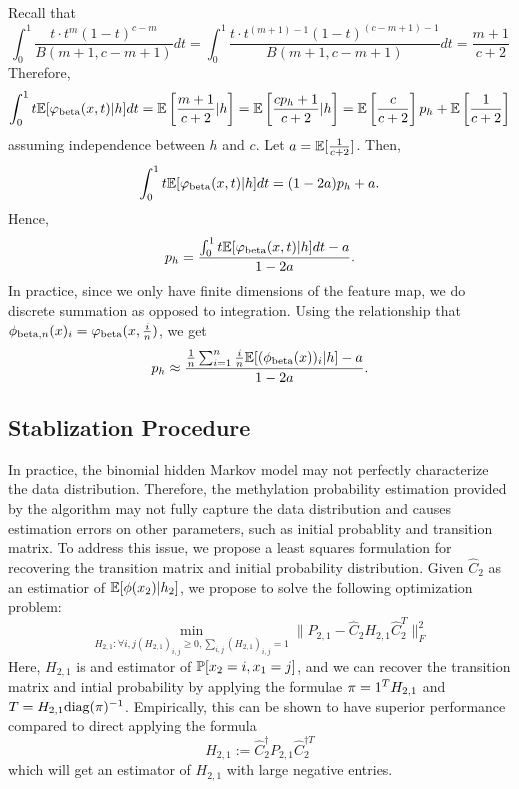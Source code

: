 Recall that
\[ \int_0^1 \frac{t \cdot t^{m} (1-t)^{c-m}}{B(m+1,c-m+1)} dt = \int_0^1 \frac{t \cdot t^{(m+1)-1} (1-t)^{(c-m+1)-1}}{B(m+1,c-m+1)} dt = \frac{m+1}{c+2} \]
Therefore,
\[ \int_0^1 t \E[\varphi_{\bet}(x,t) | h] dt = \E\sbr{\frac{m+1}{c+2} | h} = \E\sbr{\frac{cp_h + 1}{c + 2} | h} = \E\sbr{\frac{c}{c+2}} p_h + \E\sbr{\frac{1}{c+2}} \]
assuming independence between $h$ and $c$.
Let $a = \E[\frac{1}{c+2}]$. Then,
\[ \int_0^1 t\E[\varphi_\bet(x,t) | h] dt = (1 - 2a) p_h + a. \]
Hence,
\[ p_h = \frac{\int_0^1 t\E[\varphi_{\bet}(x,t) | h] dt - a}{1 - 2 a}. \]
In practice, since we only have finite dimensions of the feature map, we do discrete
summation as opposed to integration. Using the relationship that $\phi_{\bet, n}(x)_i = \varphi_{\bet}(x, \frac{i}{n})$, we get
\[ p_h \approx \frac{\frac{1}{n} \sum_{i=1}^n \frac{i}{n} \E[(\phi_{\bet}(x))_i | h] - a}{1 - 2 a}. \]

\subsection{Stablization Procedure}
In practice, the binomial hidden Markov model may not perfectly characterize the data distribution. Therefore, the methylation probability estimation provided by the algorithm may not fully capture the data distribution and causes estimation errors on other parameters, such as initial probablity and transition matrix. To address this issue, we propose a least squares formulation for recovering the transition matrix and initial probability distribution. Given $\hat{C}_2$ as an estimatior of $\E[\phi(x_2)|h_2]$, we propose to solve the following optimization problem:
\[ \min_{H_{2,1}: \forall i,j (H_{2,1})_{i,j} \geq 0, \sum_{i,j} (H_{2,1})_{i,j} = 1} \| P_{2,1} - \hat{C}_2 H_{2,1} \hat{C}_2^T \|_F^2 \]
Here, $H_{2,1}$ is and estimator of $\P[x_2 = i, x_1 = j]$, and we can recover the transition matrix and intial probability by applying the formulae $\pi =\one^T H_{2,1}$ and $T = H_{2,1} \diag(\pi)^{-1}$.
Empirically, this can be shown to have superior performance compared to direct applying the formula
\[ H_{2,1} := \hat{C}_2^{\dagger} P_{2,1} \hat{C}_2^{\dagger T}\]
which will get an estimator of $H_{2,1}$ with large negative entries.

